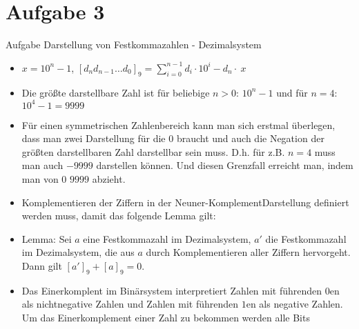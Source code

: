 
\section{Aufgabe 3}

\setcounter{exercise}{1}

\begin{frame}[allowframebreaks]{Aufgabe \thesection}{Darstellung von Festkommazahlen - Dezimalsystem}
  \begin{solution}
    \begin{itemize}
      \item $x=10^n-1$, $\displaystyle [d_{n}d_{n-1}\ldots d_{0}]_9=\sum_{i=0}^{n-1}d_{i}\cdot 10^{i}-d_{n}\cdot\ x$
      \item Die \alert{größte darstellbare Zahl} ist für beliebige $n>0$: $10^n - 1$ und für $n=4$: $10^4-1 = 9999$
      \item Für einen symmetrischen Zahlenbereich kann man sich erstmal überlegen, dass man zwei Darstellung für die $0$ braucht und auch die Negation der größten darstellbaren Zahl darstellbar sein muss. D.h. für z.B. $n = 4$ muss man auch $-9999$ darstellen können. Und diesen Grenzfall erreicht man, indem man von $0$ $9999$ abzieht.
    \end{itemize}
  \end{solution}
  \begin{exercisenoinc}
    \begin{itemize}
      \item \alert{Komplementieren} der Ziffern in der \alert{Neuner-KomplementDarstellung} definiert werden muss, damit das folgende Lemma gilt:
      \item \alert{Lemma:} Sei $a$ eine Festkommazahl im Dezimalsystem, $a'$ die Festkommazahl im Dezimalsystem, die aus $a$ durch Komplementieren aller Ziffern hervorgeht. Dann gilt $[a']_9 + [a]_9 = 0$.
    \end{itemize}
  \end{exercisenoinc}
  \begin{solutionnoinc}
    \begin{itemize}
      \item Das Einerkomplent im Binärsystem interpretiert Zahlen mit führenden $0$en als nichtnegative Zahlen und Zahlen
mit führenden $1$en als negative Zahlen. Um das Einerkomplement einer Zahl zu bekommen werden alle Bits

\end{itemize}
\end{solutionnoinc}
\end{frame}
